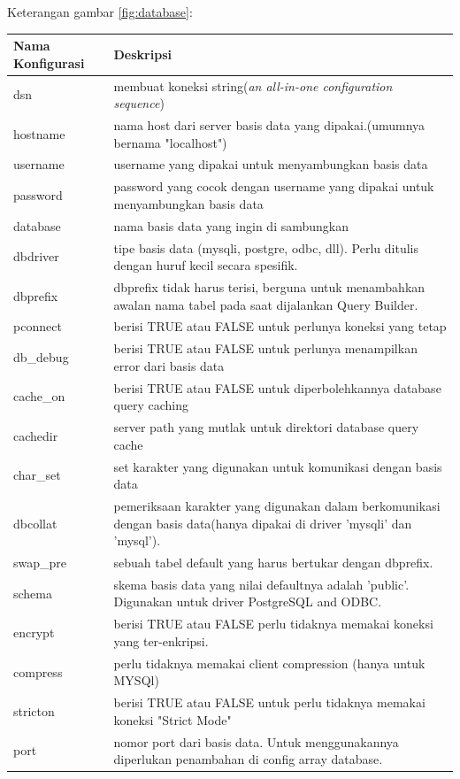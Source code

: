 		Keterangan gambar \ref{fig:database}:
		\begin{center}
		\begin{tabular}{| m{5cm} | m{10cm} |}
			\hline
			Nama Konfigurasi & Deskripsi\\
			\hline
			dsn & membuat koneksi string(\textit{an all-in-one configuration sequence})\\
			\hline
			hostname & nama host dari server basis data yang dipakai.(umumnya bernama "localhost")\\
			\hline
			username & username yang dipakai untuk menyambungkan basis data\\
			\hline
			password & password yang cocok dengan username yang dipakai untuk menyambungkan basis data\\
			\hline
			database & nama basis data yang ingin di sambungkan\\
			\hline
			dbdriver & tipe basis data (mysqli, postgre, odbc, dll). Perlu ditulis dengan huruf kecil secara spesifik.\\
			\hline
			dbprefix & dbprefix tidak harus terisi, berguna untuk menambahkan awalan nama tabel pada saat dijalankan Query Builder.\\
			\hline
			pconnect & berisi TRUE atau FALSE untuk perlunya koneksi yang tetap\\
			\hline
			db\_debug & berisi TRUE atau FALSE untuk perlunya menampilkan error dari basis data\\
			\hline
			cache\_on & berisi TRUE atau FALSE untuk diperbolehkannya database query caching\\
			\hline
			cachedir & server path yang mutlak untuk direktori database query cache\\
			\hline
			char\_set & set karakter yang digunakan untuk komunikasi dengan basis data\\
			\hline
			dbcollat & pemeriksaan karakter yang digunakan dalam berkomunikasi dengan basis data(hanya dipakai di driver 'mysqli' dan 'mysql').\\
			\hline
			swap\_pre & sebuah tabel default yang harus bertukar dengan dbprefix.\\
			\hline
			schema & skema basis data yang nilai defaultnya adalah 'public'. Digunakan untuk driver PostgreSQL and ODBC.\\
			\hline
			encrypt &  berisi TRUE atau FALSE perlu tidaknya memakai koneksi yang ter-enkripsi.\\
			\hline
			compress & perlu tidaknya memakai client compression (hanya untuk MYSQl)\\
			\hline
			stricton &  berisi TRUE atau FALSE untuk perlu tidaknya memakai koneksi "Strict Mode" \\
			\hline
			port & nomor port dari basis data. Untuk menggunakannya diperlukan penambahan di config array database.\\
			\hline
		\end{tabular}
	\end{center}
		
